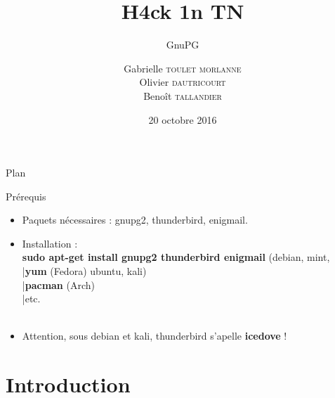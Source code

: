 \documentclass{beamer}
\title[GnuPG]{H4ck 1n TN}
\subtitle{GnuPG}
\author[H4ck1nTN]{Gabrielle \textsc{toulet morlanne}\\%
Olivier \textsc{dautricourt}\\%
Benoît \textsc{tallandier}}
\institute[HiT]{Ceten -- TELECOM Nancy}
\date{20 octobre 2016}
\begin{document}
\begin{frame}
\titlepage
\end{frame} 


\begin{frame}{Plan}
	\tableofcontents[
currentsubsection, 
sectionstyle=show, 
subsectionstyle=show, 
] 
\end{frame}

\begin{frame}{Prérequis}

\begin{itemize}
\item Paquets nécessaires : gnupg2, thunderbird, enigmail. \\
\item Installation : \\
\textbf{sudo apt-get install gnupg2 thunderbird enigmail} (debian, mint, \\
		\hspace*{0.8cm}	|\textbf{yum} (Fedora) \hspace*{5.4cm} ubuntu, kali)\\
		\hspace*{0.8cm}	|\textbf{pacman} (Arch)\\ 
		\hspace*{0.8cm}	|etc.\\ ~ \\
\item Attention, sous debian et kali, thunderbird s'apelle \textbf{icedove} !
\end{itemize}
\end{frame}

\section{Introduction}
\end{document}
